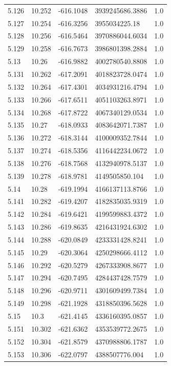 \begin{tabular}{lllll}
5.126 & 10.252 & -616.1048 & 3939245686.3886 & 1.0 \\
5.127 & 10.254 & -616.3256 & 3955034225.18 & 1.0 \\
5.128 & 10.256 & -616.5464 & 3970886044.6034 & 1.0 \\
5.129 & 10.258 & -616.7673 & 3986801398.2884 & 1.0 \\
5.13 & 10.26 & -616.9882 & 4002780540.8808 & 1.0 \\
5.131 & 10.262 & -617.2091 & 4018823728.0474 & 1.0 \\
5.132 & 10.264 & -617.4301 & 4034931216.4794 & 1.0 \\
5.133 & 10.266 & -617.6511 & 4051103263.8971 & 1.0 \\
5.134 & 10.268 & -617.8722 & 4067340129.0534 & 1.0 \\
5.135 & 10.27 & -618.0933 & 4083642071.7387 & 1.0 \\
5.136 & 10.272 & -618.3144 & 4100009352.7844 & 1.0 \\
5.137 & 10.274 & -618.5356 & 4116442234.0672 & 1.0 \\
5.138 & 10.276 & -618.7568 & 4132940978.5137 & 1.0 \\
5.139 & 10.278 & -618.9781 & 4149505850.104 & 1.0 \\
5.14 & 10.28 & -619.1994 & 4166137113.8766 & 1.0 \\
5.141 & 10.282 & -619.4207 & 4182835035.9319 & 1.0 \\
5.142 & 10.284 & -619.6421 & 4199599883.4372 & 1.0 \\
5.143 & 10.286 & -619.8635 & 4216431924.6302 & 1.0 \\
5.144 & 10.288 & -620.0849 & 4233331428.8241 & 1.0 \\
5.145 & 10.29 & -620.3064 & 4250298666.4112 & 1.0 \\
5.146 & 10.292 & -620.5279 & 4267333908.8677 & 1.0 \\
5.147 & 10.294 & -620.7495 & 4284437428.7579 & 1.0 \\
5.148 & 10.296 & -620.9711 & 4301609499.7384 & 1.0 \\
5.149 & 10.298 & -621.1928 & 4318850396.5628 & 1.0 \\
5.15 & 10.3 & -621.4145 & 4336160395.0857 & 1.0 \\
5.151 & 10.302 & -621.6362 & 4353539772.2675 & 1.0 \\
5.152 & 10.304 & -621.8579 & 4370988806.1787 & 1.0 \\
5.153 & 10.306 & -622.0797 & 4388507776.004 & 1.0 \\

\end{tabular}

